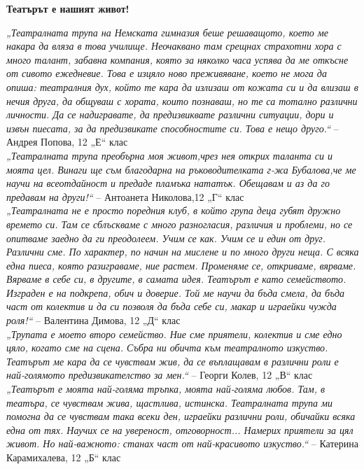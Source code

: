 \newpage
\begin{multicols}{2}

\textbf{Театърът е нашият живот!}

\textit{„Театралната трупа на Немската гимназия беше решаващото, което ме накара да вляза в това училище. Неочаквано там срещнах страхотни хора с много талант, забавна компания, която за няколко часа успява да ме откъсне от сивото ежедневие. Това е изцяло ново преживяване, което не мога да опиша: театралния дух, който те кара да излизаш от кожата си и да влизаш в нечия друга, да общуваш с хората, които познаваш, но те са тотално различни личности. Да се надигравате, да предизвиквате различни ситуации, дори и извън пиесата, за да предизвикате способностите си. Това е нещо друго.“} – Андрея Попова, 12 „Е“ клас \\

\textit{„Театралната трупа преобърна моя живот,чрез нея открих таланта си и моята цел. Винаги ще съм благодарна на ръководителката г-жа Бубалова,че ме научи на всеотдайност и предаде пламъка нататък. Обещавам и аз да го предавам на други!“} – Антоанета Николова,12 „Г“ клас \\

\textit{„Театралната не е просто поредния клуб, в който група деца губят дружно времето си. Там се сблъскваме с много разногласия, различия и проблеми, но се опитваме заедно да ги преодолеем. Учим се как. Учим се и един от друг. Различни сме. По характер, по начин на мислене и по много други неща. С всяка една пиеса, която разиграваме, ние растем. Променяме се, откриваме, вярваме. Вярваме в себе си, в другите, в самата идея. Театърът е като семейството. Изграден е на подкрепа, обич и доверие. Той ме научи да бъда смела, да бъда част от колектив и да си позволя да бъда себе си, макар и играейки чужда роля!“} – Валентина Димова, 12 „Д“ клас \\

\textit{„Трупата е моето второ семейство. Ние сме приятели, колектив и сме едно цяло, когато сме на сцена. Събра ни обичта към театралното изкуство. Театърът ме кара да се чувствам жив, да се въплащавам в различни роли е най-голямото предизвикателство за мен.“} – Георги Колев, 12 „В“ клас \\

\textit{„Театърът е моята най-голяма тръпка, моята най-голяма любов. Там, в театъра, се чувствам жива, щастлива, истинска. Театралната трупа ми помогна да се чувствам така всеки ден, играейки различни роли, обичайки всяка една от тях. Научих се на увереност, отговорност... Намерих приятели за цял живот. Но най-важното: станах част от най-красивото изкуство.“} – Катерина Карамихалева, 12 „Б“ клас \\


\end{multicols}
